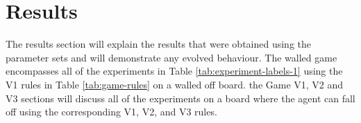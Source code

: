 \section{Results}

The results section will explain the results that were obtained using the parameter sets and will demonstrate any evolved behaviour. The walled game encompasses all of the experiments in Table \ref{tab:experiment-labels-1} using the V1 rules in Table \ref{tab:game-rules} on a walled off board. the Game V1, V2 and V3 sections will discuss all of the experiments on a board where the agent can fall off using the corresponding V1, V2, and V3 rules.





